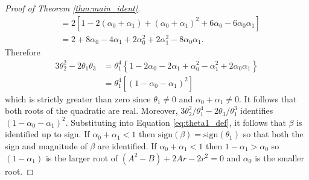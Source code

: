 \begin{proof}[Proof of Theorem \ref{thm:main_ident}]
\begin{align*}
  &=2\left[ 1 - 2(\alpha_0 + \alpha_1) + (\alpha_0 + \alpha_1)^2 + 6\alpha_0 - 6 \alpha_0 \alpha_1 \right]\\
    &= 2 + 8\alpha_0 - 4\alpha_1 + 2\alpha_0^2 +  2\alpha_1^2 - 8 \alpha_0 \alpha_1.
  \end{align*}
Therefore
  \begin{align*}
    3\theta^2_2 - 2\theta_1 \theta_3 
    &= \theta_1^4 \left\{ 1 - 2 \alpha_0 - 2 \alpha_1 + \alpha_0^2 - \alpha_1^2 + 2\alpha_0 \alpha_1 \right\}\\
    &= \theta_1^4 \left[ (1 - \alpha_0 - \alpha_1)^2 \right]
  \end{align*}
which is strictly greater than zero since $\theta_1 \neq 0$ and $\alpha_0 + \alpha_1 \neq 0$.
It follows that both roots of the quadratic are real.
Moreover, $3\theta_2^2/\theta_1^4 - 2\theta_3/\theta_1^3$ identifies $(1 - \alpha_0 - \alpha_1)^2$.
Substituting into Equation \ref{eq:theta1_def}, it follows that $\beta$ is identified up to sign.
If $\alpha_0 + \alpha_1 < 1$ then $\mbox{sign}(\beta) = \mbox{sign}(\theta_1)$ so that both the sign and magnitude of $\beta$ are identified.
If $\alpha_0 + \alpha_1 < 1$ then $1 - \alpha_1 > \alpha_0$ so $(1 - \alpha_1)$ is the larger root of $(A^2 - B) + 2Ar - 2r^2=0$ and $\alpha_0$ is the smaller root.
\end{proof}
